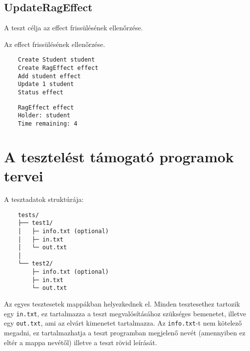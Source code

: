 \subsection{UpdateRagEffect}
\begin{test-case-description}
    A teszt célja az effect frissülésének ellenőrzése.
\end{test-case-description}
\begin{test-case-function}
    Az effect frissülésének ellenőrzése.
\end{test-case-function}
\begin{test-case-input}
    \begin{verbatim}
    Create Student student
    Create RagEffect effect
    Add student effect
    Update 1 student
    Status effect
    \end{verbatim}
\end{test-case-input}
\begin{test-case-output}
    \begin{verbatim}
    RagEffect effect
    Holder: student
    Time remaining: 4
    \end{verbatim}
\end{test-case-output}

\clearpage
\section{A tesztelést támogató programok tervei}
A tesztadatok struktúrája:
\begin{verbatim}
    tests/
    ├── test1/
    │   ├─ info.txt (optional)
    │   ├─ in.txt
    │   └─ out.txt
    │
    └── test2/
        ├─ info.txt (optional)
        ├─ in.txt
        └─ out.txt
\end{verbatim}
Az egyes tesztesetek mappákban helyezkednek el. Minden tesztesethez tartozik egy \texttt{in.txt}, ez tartalmazza a teszt megvalósításához szükséges bemenetet, illetve egy \texttt{out.txt}, ami az elvárt kimenetet tartalmazza. Az \texttt{info.txt}-t nem kötelező megadni, ez tartalmazhatja a teszt programban megjelenő nevét (amennyiben ez eltér a mappa nevétől) illetve a teszt rövid leírását.

